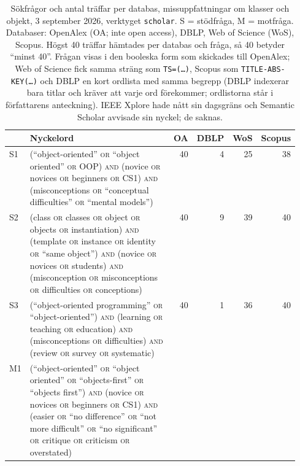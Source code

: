 \begin{table}[!htb]
  \centering
  \caption{Sökfrågor och antal träffar per databas,
    missuppfattningar om klasser och objekt, 3 september 2026, verktyget
    \texttt{scholar}.  S = stödfråga, M = motfråga.  Databaser: OpenAlex
    (OA; inte \foreignlanguage{english}{open access}), DBLP, Web of
    Science (WoS), Scopus.  Högst 40 träffar hämtades per databas och
    fråga, så 40 betyder \enquote{minst 40}.  Frågan visas i den
    booleska form som skickades till OpenAlex; Web of Science fick samma
    sträng som \texttt{TS=(\dots)}, Scopus som
    \texttt{TITLE-ABS-KEY(\dots)} och DBLP en kort ordlista med samma
    begrepp (DBLP indexerar bara titlar och kräver att varje ord
    förekommer; ordlistorna står i författarens anteckning).  IEEE Xplore
    hade nått sin dagsgräns och Semantic Scholar avvisade sin nyckel; de
    saknas.}
  \label{tab:sok-queries-B}
  \footnotesize
  \begin{tabular}{@{}lp{0.55\linewidth}rrrr@{}}
    \toprule
    & Nyckelord & OA & DBLP & WoS & Scopus \\
    \midrule
    S1 & (\enquote{object-oriented} \textsc{or} \enquote{object oriented} \textsc{or} OOP) \textsc{and} (novice \textsc{or} novices \textsc{or} beginners \textsc{or} CS1) \textsc{and} (misconceptions \textsc{or} \enquote{conceptual difficulties} \textsc{or} \enquote{mental models})
       & 40 & 4 & 25 & 38 \\
    S2 & (class \textsc{or} classes \textsc{or} object \textsc{or} objects \textsc{or} instantiation) \textsc{and} (template \textsc{or} instance \textsc{or} identity \textsc{or} \enquote{same object}) \textsc{and} (novice \textsc{or} novices \textsc{or} students) \textsc{and} (misconception \textsc{or} misconceptions \textsc{or} difficulties \textsc{or} conceptions)
       & 40 & 9 & 39 & 40 \\
    S3 & (\enquote{object-oriented programming} \textsc{or} \enquote{object-oriented}) \textsc{and} (learning \textsc{or} teaching \textsc{or} education) \textsc{and} (misconceptions \textsc{or} difficulties) \textsc{and} (review \textsc{or} survey \textsc{or} systematic)
       & 40 & 1 & 36 & 40 \\
    \midrule
    M1 & (\enquote{object-oriented} \textsc{or} \enquote{object oriented} \textsc{or} \enquote{objects-first} \textsc{or} \enquote{objects first}) \textsc{and} (novice \textsc{or} novices \textsc{or} beginners \textsc{or} CS1) \textsc{and} (easier \textsc{or} \enquote{no difference} \textsc{or} \enquote{not more difficult} \textsc{or} \enquote{no significant} \textsc{or} critique \textsc{or} criticism \textsc{or} overstated)

\end{tabular}
\end{table}
